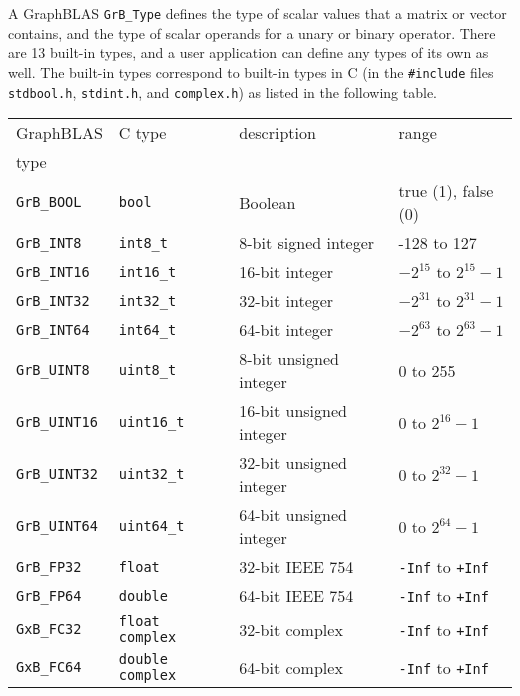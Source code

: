 \documentclass[12pt]{article}
\begin{document}
A GraphBLAS \verb'GrB_Type' defines the type of scalar values that a matrix or
vector contains, and the type of scalar operands for a unary or binary
operator.  There are 13 built-in types, and a user application can define
any types of its own as well.  The built-in types correspond to built-in types
in C (in the \verb'#include' files \verb'stdbool.h', \verb'stdint.h', and
\verb'complex.h') as listed in the following table.

\vspace{0.2in}
\noindent
{\footnotesize
\begin{tabular}{llll}
\hline
GraphBLAS         & C type           & description              & range \\
type              &                  &                          & \\
\hline
\verb'GrB_BOOL'   & \verb'bool'      & Boolean                  & true (1), false (0) \\
\hline
\verb'GrB_INT8'   & \verb'int8_t'    & 8-bit signed integer     & -128 to 127 \\
\verb'GrB_INT16'  & \verb'int16_t'   & 16-bit integer           & $-2^{15}$ to $2^{15}-1$ \\
\verb'GrB_INT32'  & \verb'int32_t'   & 32-bit integer           & $-2^{31}$ to $2^{31}-1$ \\
\verb'GrB_INT64'  & \verb'int64_t'   & 64-bit integer           & $-2^{63}$ to $2^{63}-1$ \\
\hline
\verb'GrB_UINT8'  & \verb'uint8_t'   & 8-bit unsigned integer   & 0 to 255 \\
\verb'GrB_UINT16' & \verb'uint16_t'  & 16-bit unsigned integer  & 0 to $2^{16}-1$ \\
\verb'GrB_UINT32' & \verb'uint32_t'  & 32-bit unsigned integer  & 0 to $2^{32}-1$ \\
\verb'GrB_UINT64' & \verb'uint64_t'  & 64-bit unsigned integer  & 0 to $2^{64}-1$ \\
\hline
\verb'GrB_FP32'   & \verb'float'     & 32-bit IEEE 754          & \verb'-Inf' to \verb'+Inf'\\
\verb'GrB_FP64'   & \verb'double'    & 64-bit IEEE 754          & \verb'-Inf' to \verb'+Inf'\\
\hline
\verb'GxB_FC32'   & \verb'float complex'  & 32-bit complex & \verb'-Inf' to \verb'+Inf'\\
\verb'GxB_FC64'   & \verb'double complex' & 64-bit complex & \verb'-Inf' to \verb'+Inf'\\
\hline
\end{tabular}
}
\vspace{0.2in}
\end{document}
